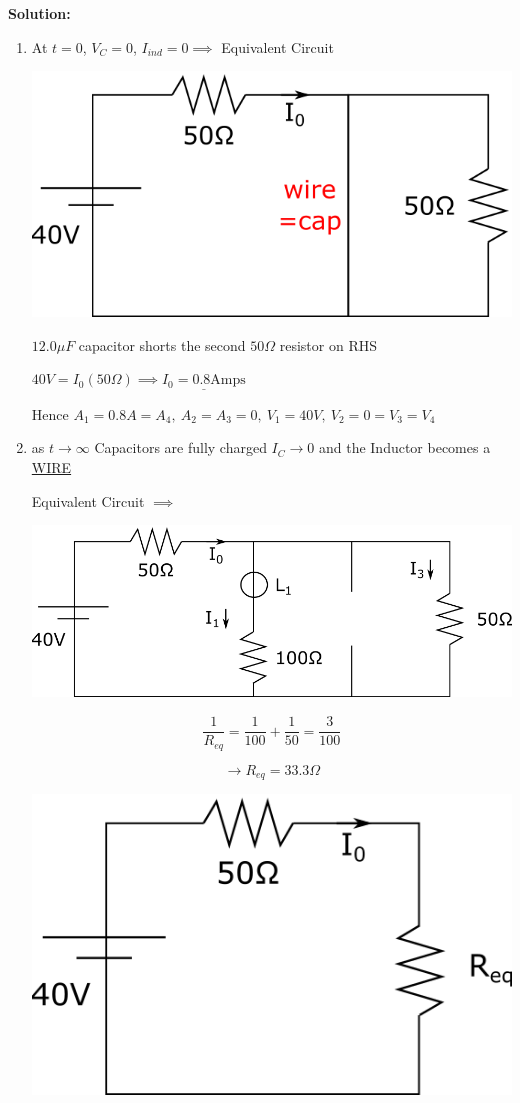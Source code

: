 \textbf{Solution:}\\
\begin{enumerate}
	\item At $t=0$, $V_C=0$, $I_{ind}=0 \implies$ Equivalent Circuit
	
	\vspace{5mm}
	\includegraphics[width=0.4\linewidth]{Images/P11img2.png}
	\vspace{5mm}
	
	$12.0\mu F$ capacitor shorts the second $50\Omega$ resistor on RHS
	
	$40V=I_0(50\Omega)\implies \underline{I_0=0.8\textrm{Amps}}$
	
	Hence $A_1=0.8A=A_4, \: A_2=A_3=0, \: V_1=40V, \: V_2=0=V_3=V_4$
	
	\item as $t\rightarrow \infty$ Capacitors are fully charged $I_C\rightarrow 0$ and the Inductor becomes a \underline{WIRE}
	\vspace{5mm}
	
	Equivalent Circuit $\implies$
	
	\vspace{5mm}
	\includegraphics[width=0.6\linewidth]{Images/P11img3.png}
	
	$$\frac{1}{R_{eq}}=\frac{1}{100}+\frac{1}{50}=\frac{3}{100}$$
	
	$$\rightarrow R_{eq}=33.3\Omega$$
	
	\vspace{5mm}
	\includegraphics[width=0.35\linewidth]{Images/P11img4.png}
	\vspace{5mm}
	

\end{enumerate}
